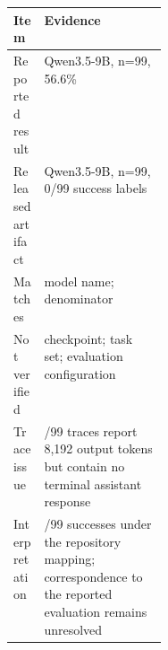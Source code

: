 \begin{tabularx}{\linewidth}{@{}>{\raggedright\arraybackslash}p{0.20\linewidth}>{\raggedright\arraybackslash}X@{}}
\toprule
Item & Evidence \\
\midrule
Reported result & Qwen3.5-9B, n=99, 56.6\% \\
Released artifact & Qwen3.5-9B, n=99, 0/99 success labels \\
Matches & model name; denominator \\
Not verified & checkpoint; task set; evaluation configuration \\
Trace issue & 3/99 traces report 8,192 output tokens but contain no terminal assistant response \\
Interpretation & 0/99 successes under the repository mapping; correspondence to the reported evaluation remains unresolved \\
\bottomrule
\end{tabularx}
